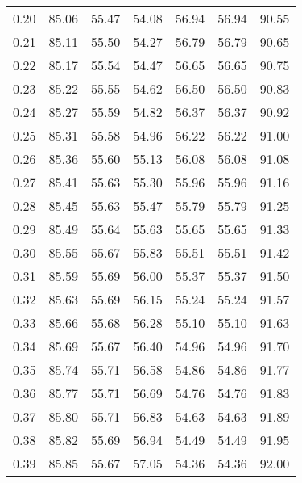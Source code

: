 \begin{tabular}{|c|c|c|c|c|c|c|}
      0.20 &     85.06 &     55.47 &      54.08 &   56.94 &      56.94 &         90.55 \\
      0.21 &     85.11 &     55.50 &      54.27 &   56.79 &      56.79 &         90.65 \\
      0.22 &     85.17 &     55.54 &      54.47 &   56.65 &      56.65 &         90.75 \\
      0.23 &     85.22 &     55.55 &      54.62 &   56.50 &      56.50 &         90.83 \\
      0.24 &     85.27 &     55.59 &      54.82 &   56.37 &      56.37 &         90.92 \\
      0.25 &     85.31 &     55.58 &      54.96 &   56.22 &      56.22 &         91.00 \\
      0.26 &     85.36 &     55.60 &      55.13 &   56.08 &      56.08 &         91.08 \\
      0.27 &     85.41 &     55.63 &      55.30 &   55.96 &      55.96 &         91.16 \\
      0.28 &     85.45 &     55.63 &      55.47 &   55.79 &      55.79 &         91.25 \\
      0.29 &     85.49 &     55.64 &      55.63 &   55.65 &      55.65 &         91.33 \\
      0.30 &     85.55 &     55.67 &      55.83 &   55.51 &      55.51 &         91.42 \\
      0.31 &     85.59 &     55.69 &      56.00 &   55.37 &      55.37 &         91.50 \\
      0.32 &     85.63 &     55.69 &      56.15 &   55.24 &      55.24 &         91.57 \\
      0.33 &     85.66 &     55.68 &      56.28 &   55.10 &      55.10 &         91.63 \\
      0.34 &     85.69 &     55.67 &      56.40 &   54.96 &      54.96 &         91.70 \\
      0.35 &     85.74 &     55.71 &      56.58 &   54.86 &      54.86 &         91.77 \\
      0.36 &     85.77 &     55.71 &      56.69 &   54.76 &      54.76 &         91.83 \\
      0.37 &     85.80 &     55.71 &      56.83 &   54.63 &      54.63 &         91.89 \\
      0.38 &     85.82 &     55.69 &      56.94 &   54.49 &      54.49 &         91.95 \\
      0.39 &     85.85 &     55.67 &      57.05 &   54.36 &      54.36 &         92.00 \\

\end{tabular}
